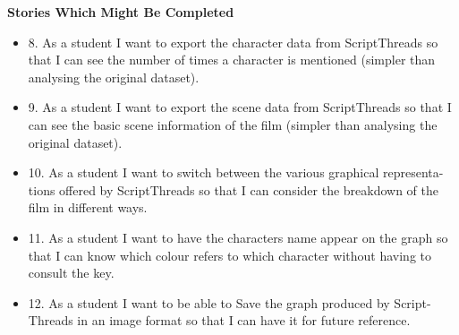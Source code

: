 \documentclass{article}
\begin{document}
\textbf{Stories Which Might Be Completed}
\begin{itemize}
    \item 8. As a student I want to export the character data from ScriptThreads so that I can see the number of times a character is mentioned (simpler than analysing the original dataset).
    \item 9. As a student I want to export the scene data from ScriptThreads so that I can see the basic scene information of the film (simpler than analysing the original dataset).
    \item 10. As a student I want to switch between the various graphical representa- tions offered by ScriptThreads so that I can consider the breakdown of the film in different ways.
    \item 11. As a student I want to have the characters name appear on the graph so that I can know which colour refers to which character without having to consult the key.
    \item 12. As a student I want to be able to Save the graph produced by Script- Threads in an image format so that I can have it for future reference.
\end{itemize}
\end{document}
